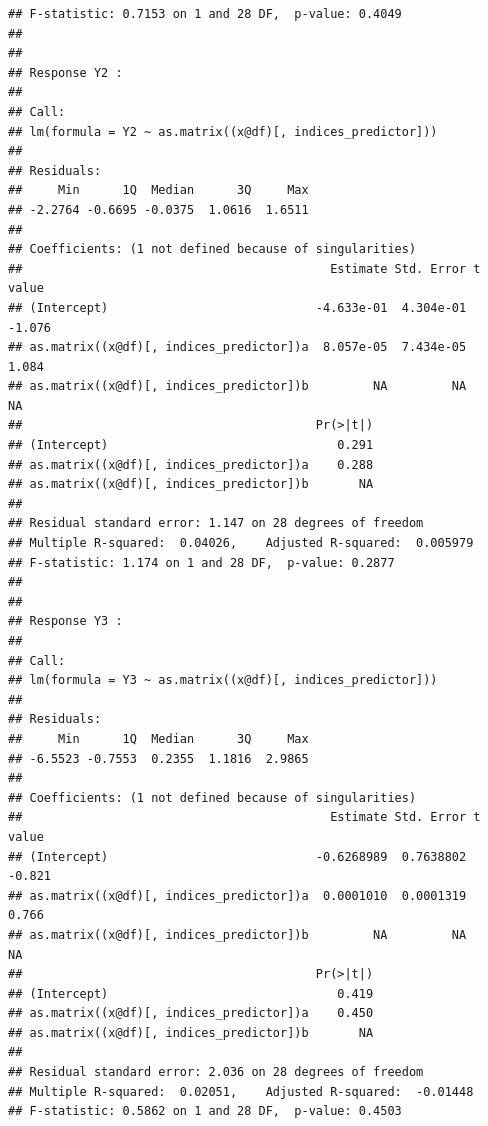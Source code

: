 \documentclass{article}\usepackage[]{graphicx}\usepackage[]{color}
\makeatletter
\newenvironment{kframe}{%
 \def\at@end@of@kframe{}%
 \ifinner\ifhmode%
  \def\at@end@of@kframe{\end{minipage}}%
  \begin{minipage}{\columnwidth}%
 \fi\fi%
 \def\FrameCommand##1{\hskip\@totalleftmargin \hskip-\fboxsep
 \colorbox{shadecolor}{##1}\hskip-\fboxsep
     \hskip-\linewidth \hskip-\@totalleftmargin \hskip\columnwidth}%
 \MakeFramed {\advance\hsize-\width
   \@totalleftmargin\z@ \linewidth\hsize
   \@setminipage}}%
 {\par\unskip\endMakeFramed%
 \at@end@of@kframe}
\newenvironment{knitrout}{}{} %
\makeatother
\begin{document}
\begin{knitrout}
\begin{kframe}
\begin{verbatim}
## F-statistic: 0.7153 on 1 and 28 DF,  p-value: 0.4049
## 
## 
## Response Y2 :
## 
## Call:
## lm(formula = Y2 ~ as.matrix((x@df)[, indices_predictor]))
## 
## Residuals:
##     Min      1Q  Median      3Q     Max 
## -2.2764 -0.6695 -0.0375  1.0616  1.6511 
## 
## Coefficients: (1 not defined because of singularities)
##                                           Estimate Std. Error t value
## (Intercept)                             -4.633e-01  4.304e-01  -1.076
## as.matrix((x@df)[, indices_predictor])a  8.057e-05  7.434e-05   1.084
## as.matrix((x@df)[, indices_predictor])b         NA         NA      NA
##                                         Pr(>|t|)
## (Intercept)                                0.291
## as.matrix((x@df)[, indices_predictor])a    0.288
## as.matrix((x@df)[, indices_predictor])b       NA
## 
## Residual standard error: 1.147 on 28 degrees of freedom
## Multiple R-squared:  0.04026,	Adjusted R-squared:  0.005979 
## F-statistic: 1.174 on 1 and 28 DF,  p-value: 0.2877
## 
## 
## Response Y3 :
## 
## Call:
## lm(formula = Y3 ~ as.matrix((x@df)[, indices_predictor]))
## 
## Residuals:
##     Min      1Q  Median      3Q     Max 
## -6.5523 -0.7553  0.2355  1.1816  2.9865 
## 
## Coefficients: (1 not defined because of singularities)
##                                           Estimate Std. Error t value
## (Intercept)                             -0.6268989  0.7638802  -0.821
## as.matrix((x@df)[, indices_predictor])a  0.0001010  0.0001319   0.766
## as.matrix((x@df)[, indices_predictor])b         NA         NA      NA
##                                         Pr(>|t|)
## (Intercept)                                0.419
## as.matrix((x@df)[, indices_predictor])a    0.450
## as.matrix((x@df)[, indices_predictor])b       NA
## 
## Residual standard error: 2.036 on 28 degrees of freedom
## Multiple R-squared:  0.02051,	Adjusted R-squared:  -0.01448 
## F-statistic: 0.5862 on 1 and 28 DF,  p-value: 0.4503
\end{verbatim}
\end{kframe}
\end{knitrout}
\end{document}
